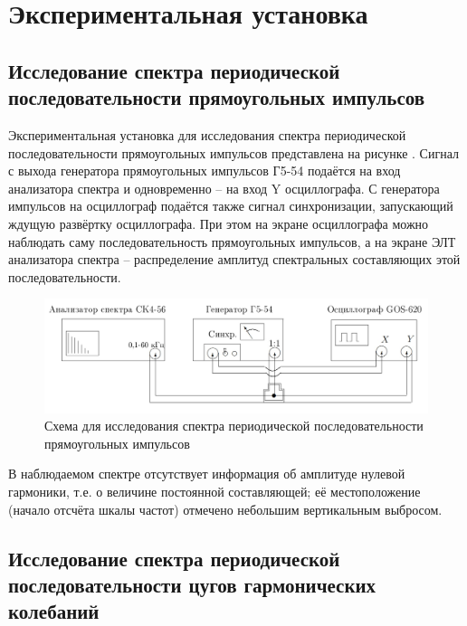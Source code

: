\documentclass[a4paper,10pt]{article}
\begin{document}
\section*{Экспериментальная установка}

\subsection*{Исследование спектра периодической последовательности прямоугольных импульсов}

Экспериментальная установка для исследования спектра периодической последовательности прямоугольных импульсов представлена на рисунке . Сигнал с выхода генератора прямоугольных импульсов Г5-54 подаётся на вход анализатора спектра и одновременно -- на вход Y осциллографа. С генератора импульсов на осциллограф подаётся также сигнал синхронизации, запускающий ждущую развёртку осциллографа. При этом на экране осциллографа можно наблюдать саму последовательность прямоугольных импульсов, а на экране ЭЛТ анализатора спектра -- распределение амплитуд спектральных составляющих этой последовательности.

\begin{figure}[h]
	\centering
	\includegraphics[scale=0.27]{Device}
	\caption{Схема для исследования спектра периодической последовательности прямоугольных импульсов} \label{Device}
\end{figure}

В наблюдаемом спектре отсутствует информация об амплитуде нулевой гармоники, т.е. о величине постоянной составляющей; её местоположение (начало отсчёта шкалы частот) отмечено небольшим вертикальным выбросом.

\subsection*{Исследование спектра периодической последовательности цугов гармонических колебаний}
\end{document}
